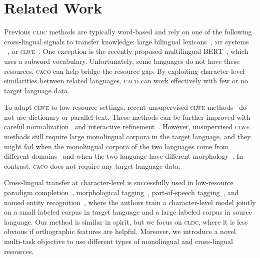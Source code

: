 \documentclass[letterpaper]{article} %
\newcommand{\citep}{\cite}
\newcommand{\abr}[1]{\textsc{#1}}
\newcommand{\name}[0]{\textsc{caco}}
\begin{document}

\section{Related Work}\label{sec:related}

Previous \abr{cldc} methods are typically word-based and rely on one of the
following cross-lingual signals to transfer knowledge: large bilingual
lexicons~\citep{shi-10,andrade-15}, \abr{mt} systems
~\citep{banea-08-fixed,wan-09-fixed,zhou-16}, or
\abr{clwe}~\citep{klementiev-12}.
One exception is the recently proposed multilingual
BERT~\citep{devlin-19,wu-19}, which uses a subword vocabulary.
Unfortunately, some languages do not have these resources.
\name{} can help bridge the resource gap.
By exploiting character-level similarities between related languages, \name{}
can work effectively with few or no target language data.

To adapt \abr{clwe} to low-resource settings, recent unsupervised \abr{clwe}
methods~\citep{conneau-18,artetxe-18b} do not use dictionary or parallel text.
These methods can be further improved with careful
normalization~\citep{zhang-19} and interactive refinement~\citep{yuan-19}.
However, unsupervised \abr{clwe} methods still require large monolingual
corpora in the target language, and they might fail when the monolingual corpora
of the two languages come from different domains~\citep{sogaard-18,fujinuma-19}
and when the two language have different morphology~\citep{czarnowska-19}.
In contrast, \name{} does not require any target language data.

Cross-lingual transfer at character-level is successfully used in low-resource
paradigm completion~\citep{kann-17}, morphological
tagging~\citep{cotterell-17a}, part-of-speech tagging~\citep{kim-17}, and named
entity recognition~\citep{bharadwaj-16,cotterell-17b,lin-18,rijhwani-19}, where
the authors train a character-level model jointly on a small labeled corpus in
target language and a large labeled corpus in source language.
Our method is similar in spirit, but we focus on \abr{cldc}, where it is less
obvious if orthographic features are helpful.
Moreover, we introduce a novel multi-task objective to use different types of
monolingual and cross-lingual resources.
\end{document}
